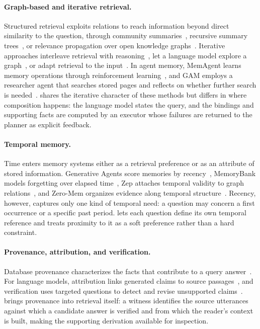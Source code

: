 \paragraph{Graph-based and iterative retrieval.}
Structured retrieval exploits relations to reach information beyond
direct similarity to the question, through community
summaries~\cite{edge2024graphrag}, recursive summary
trees~\cite{sarthi2024raptor}, or relevance propagation over open
knowledge graphs~\cite{gutierrez2024hipporag,gutierrez2025hipporag2}.
Iterative approaches interleave retrieval with
reasoning~\cite{trivedi2023ircot}, let a language model explore a
graph~\cite{sun2024tog}, or adapt retrieval to the
input~\cite{asai2024selfrag,jeong2024adaptiverag}. In agent memory,
MemAgent learns memory operations through reinforcement
learning~\cite{yu2026memagent}, and GAM employs a researcher agent that
searches stored pages and reflects on whether further search is
needed~\cite{yan2025gam}. \sys shares the iterative character of these
methods but differs in where composition happens: the language model
states the query, and the bindings and supporting facts are computed by
an executor whose failures are returned to the planner as explicit
feedback.

\paragraph{Temporal memory.}
Time enters memory systems either as a retrieval preference or as an
attribute of stored information. Generative Agents score memories by
recency~\cite{park2023generative}, MemoryBank models forgetting over
elapsed time~\cite{zhong2024memorybank}, Zep attaches temporal validity
to graph relations~\cite{rasmussen2025zep}, and Zero-Mem organizes
evidence along temporal structure~\cite{xiao2026zeromem}. Recency,
however, captures only one kind of temporal need: a question may concern
a first occurrence or a specific past period. \sys lets each question
define its own temporal reference and treats proximity to it as a soft
preference rather than a hard constraint.

\paragraph{Provenance, attribution, and verification.}
Database provenance characterizes the facts that contribute to a query
answer~\cite{buneman2001why,green2007provenance}. For language models,
attribution links generated claims to source passages~\cite{gao2023alce},
and verification uses targeted questions to detect and revise unsupported
claims~\cite{dhuliawala2024cove}. \sys brings provenance into retrieval
itself: a witness identifies the source utterances against which a
candidate answer is verified and from which the reader's context is
built, making the supporting derivation available for inspection.
